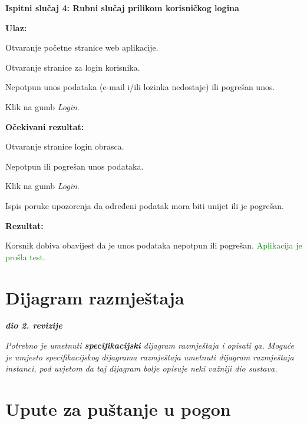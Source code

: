  			\textnormal{\textbf{Ispitni slučaj 4: Rubni slučaj prilikom korisničkog logina}\\}
 			
 			\textnormal{\textbf{Ulaz:}}
 			
 			\begin{packed_enum}
 				\item Otvaranje početne stranice web aplikacije.
 				\item Otvaranje stranice za login korisnika.
 				\item Nepotpun unos podataka (e-mail i/ili lozinka nedostaje) ili pogrešan unos.
 				\item Klik na gumb \textit{Login}.
 			\end{packed_enum}
 			
 			\textnormal{\textbf{Očekivani rezultat:}}
 			
 			\begin{packed_enum}
 				\item Otvaranje stranice login obrasca.
 				\item Nepotpun ili pogrešan unos podataka.
 				\item Klik na gumb \textit{Login}.
 				\item Ispis poruke upozorenja da određeni podatak mora biti unijet ili je pogrešan.
 			\end{packed_enum}
 			
 			\textnormal{\textbf{Rezultat:}}
 			
 			\textnormal{Korsnik dobiva obavijest da je unos podataka nepotpun ili pogrešan. \textcolor{green}{Aplikacija je prošla test.}}
			
			\eject 
		
		
		\section{Dijagram razmještaja}
			
			\textbf{\textit{dio 2. revizije}}
			
			 \textit{Potrebno je umetnuti \textbf{specifikacijski} dijagram razmještaja i opisati ga. Moguće je umjesto specifikacijskog dijagrama razmještaja umetnuti dijagram razmještaja instanci, pod uvjetom da taj dijagram bolje opisuje neki važniji dio sustava.}
			
			\eject 
		
		\section{Upute za puštanje u pogon}
		
